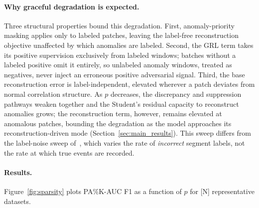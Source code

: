 \paragraph{Why graceful degradation is expected.}
Three structural properties bound this degradation.
First, anomaly-priority masking applies only to labeled patches, leaving the label-free
reconstruction objective unaffected by which anomalies are labeled.
Second, the GRL term takes its positive supervision exclusively from labeled windows; batches
without a labeled positive omit it entirely, so unlabeled anomaly windows, treated as
negatives, never inject an erroneous positive adversarial signal.
Third, the base reconstruction error is label-independent, elevated wherever a patch deviates
from normal correlation structure.
As $p$ decreases, the discrepancy and suppression pathways weaken together and the Student's
residual capacity to reconstruct anomalies grows; the reconstruction term, however, remains
elevated at anomalous patches, bounding the degradation as the model approaches its
reconstruction-driven mode (Section~\ref{sec:main_results}).
This sweep differs from the label-noise sweep of~\cite{wang2025nrdetector}, which varies the
rate of \emph{incorrect} segment labels, not the rate at which true events are recorded.

\paragraph{Results.}
Figure~\ref{fig:sparsity} plots PA\%K-AUC F1 as a function of $p$ for [N] representative
datasets.

